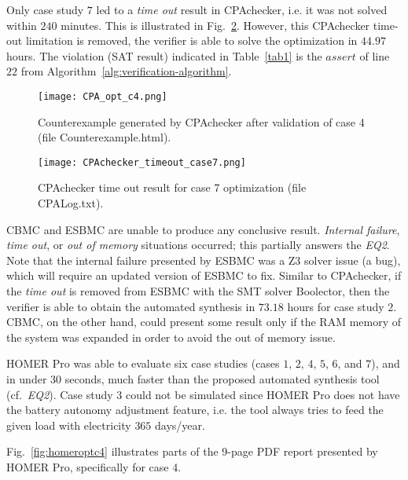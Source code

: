 Only case study $7$ led to a \textit{time out} result in CPAchecker, i.e.  it was not solved within $240$ minutes. This is illustrated in Fig.~\ref{fig:cpaoptcase7}. However, this CPAchecker time-out limitation is removed, the verifier is able to solve the optimization in $44.97$ hours. The violation (SAT result) indicated in Table~\ref{tab1} 
is the $assert$ of line $22$ from Algorithm~\ref{alg:verification-algorithm}. %

\begin{figure}[h]
\texttt{[image: CPA\_opt\_c4.png]}
\centering
\caption{Counterexample generated by CPAchecker after validation of case 4 (file Counterexample.html).}
\label{fig:CPAoptc1}
\end{figure}

\begin{figure}[h]
\texttt{[image: CPAchecker\_timeout\_case7.png]}
\centering
\caption{CPAchecker time out result for case 7 optimization (file CPALog.txt).}
\label{fig:cpaoptcase7}
\end{figure}

CBMC and ESBMC are unable to produce any conclusive result. \textit{Internal failure}, \textit{time out}, or \textit{out of memory} situations occurred; this partially answers the \textit{EQ2}. Note that the internal failure presented by ESBMC was a Z3 solver issue (a bug), which will require an updated version of ESBMC to fix. Similar to CPAchecker, if the \textit{time out} is removed from ESBMC with the SMT solver Boolector, then the verifier is able to obtain the automated synthesis in $73.18$ hours for case study $2$. CBMC, on the other hand,  could present some result only if the RAM memory of the system was expanded in order to avoid the out of memory issue.

HOMER Pro was able to evaluate six case studies (cases $1$, $2$, $4$, $5$, $6$, and $7$), and in under $30$ seconds, much faster than the proposed automated synthesis tool (cf.~\textit{EQ2}). Case study $3$ could not be simulated since HOMER Pro does not have the battery autonomy adjustment feature, i.e. the tool always tries to feed the given load with electricity $365$ days/year. 

Fig.~\ref{fig:homeroptc4} illustrates parts of the 9-page PDF report presented by HOMER Pro, specifically for case 4.

